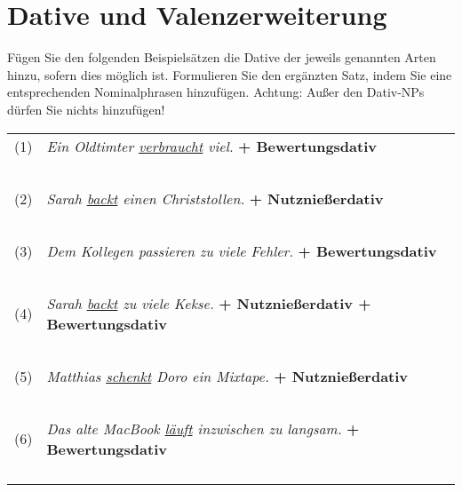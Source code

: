 \section{Dative und Valenzerweiterung}\label{sec:dative}

Fügen Sie den folgenden Beispielsätzen die Dative der jeweils genannten Arten hinzu, sofern dies möglich ist.
Formulieren Sie den ergänzten Satz, indem Sie eine entsprechenden Nominalphrasen hinzufügen.
Achtung: Außer den Dativ-NPs dürfen Sie nichts hinzufügen!

\begin{center}
  \begin{longtable}[h]{cp{}}
    (1)  & \textit{Ein Oldtimter \ul{verbraucht} viel.} \textbf{+ Bewertungsdativ}\\
    &\\
    &\\\cline{2-2}
    &\\
    &\\\cline{2-2}
    &\\
    (2)  & \textit{Sarah \ul{backt} einen Christstollen.} \textbf{+ Nutznießerdativ}\\
    &\\
    &\\\cline{2-2}
    &\\
    &\\\cline{2-2}
    &\\
    (3)  & \textit{Dem Kollegen passieren zu viele Fehler.} \textbf{+ Bewertungsdativ}\\
    &\\
    &\\\cline{2-2}
    &\\
    &\\\cline{2-2}
    &\\
    (4)  & \textit{Sarah \ul{backt} zu viele Kekse.} \textbf{+ Nutznießerdativ + Bewertungsdativ}\\
    &\\
    &\\\cline{2-2}
    &\\
    &\\\cline{2-2}
    &\\
    (5)  & \textit{Matthias \ul{schenkt} Doro ein Mixtape.} \textbf{+ Nutznießerdativ}\\
    &\\
    &\\\cline{2-2}
    &\\
    &\\\cline{2-2}
    &\\
    (6)  & \textit{Das alte MacBook \ul{läuft} inzwischen zu langsam.} \textbf{+ Bewertungsdativ}\\
    &\\
    &\\\cline{2-2}
    &\\
    &\\\cline{2-2}
  \end{longtable}
\end{center}

